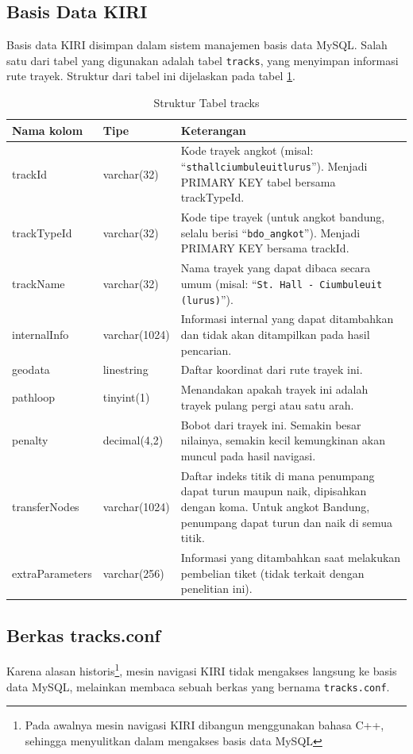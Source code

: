 \subsection{Basis Data KIRI}
Basis data KIRI disimpan dalam sistem manajemen basis data MySQL. Salah satu dari tabel yang digunakan adalah tabel \texttt{tracks}, yang menyimpan informasi rute trayek. Struktur dari tabel ini dijelaskan pada tabel \ref{tab:2_struktur_tabel_tracks}.

\begin{table}
	\caption{Struktur Tabel tracks}
	\label{tab:2_struktur_tabel_tracks}
	\begin{tabular}{|p{3cm}|p{2.5cm}|p{9.5cm}|}
		\hline
		Nama kolom & Tipe & Keterangan \\
		\hline
		trackId & varchar(32) & Kode trayek angkot (misal: ``\texttt{sthallciumbuleuitlurus}''). Menjadi PRIMARY KEY tabel bersama trackTypeId. \\
		trackTypeId & varchar(32) & Kode tipe trayek (untuk angkot bandung, selalu berisi ``\texttt{bdo\_angkot}''). Menjadi PRIMARY KEY bersama trackId. \\
		trackName & varchar(32) & Nama trayek yang dapat dibaca secara umum (misal: ``\texttt{St. Hall - Ciumbuleuit (lurus)}''). \\
		internalInfo & varchar(1024) & Informasi internal yang dapat ditambahkan dan tidak akan ditampilkan pada hasil pencarian. \\
		geodata & linestring & Daftar koordinat dari rute trayek ini. \\
		pathloop & tinyint(1) & Menandakan apakah trayek ini adalah trayek pulang pergi atau satu arah. \\
		penalty & decimal(4,2) & Bobot dari trayek ini. Semakin besar nilainya, semakin kecil kemungkinan akan muncul pada hasil navigasi. \\
		transferNodes & varchar(1024) & Daftar indeks titik di mana penumpang dapat turun maupun naik, dipisahkan dengan koma. Untuk angkot Bandung, penumpang dapat turun dan naik di semua titik. \\
		extraParameters & varchar(256) & Informasi yang ditambahkan saat melakukan pembelian tiket (tidak terkait dengan penelitian ini). \\
		\hline
	\end{tabular}
\end{table}

\subsection{Berkas tracks.conf}
Karena alasan historis\footnote{Pada awalnya mesin navigasi KIRI dibangun menggunakan bahasa C++, sehingga menyulitkan dalam mengakses basis data MySQL}, mesin navigasi KIRI tidak mengakses langsung ke basis data MySQL, melainkan membaca sebuah berkas yang bernama \texttt{tracks.conf}.

